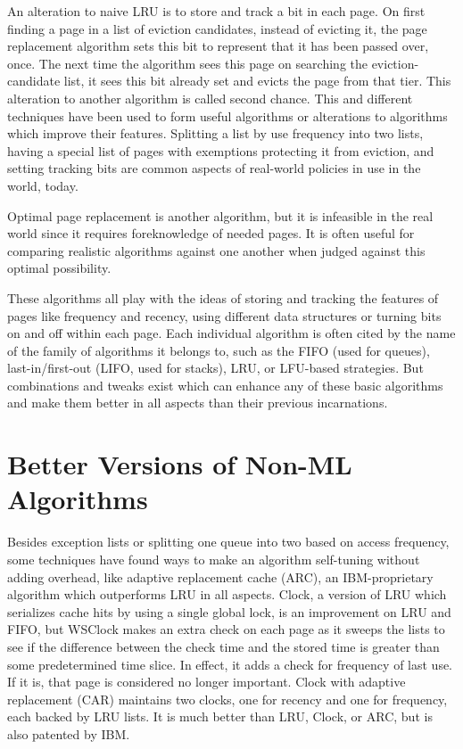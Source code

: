 \documentclass[conference]{IEEEtran}
\begin{document}
An alteration to naive LRU is to store and track a bit in each page.  On first finding a page in a list of eviction candidates, instead of evicting it, the page replacement algorithm sets this bit to represent that it has been passed over, once.  The next time the algorithm sees this page on searching the eviction-candidate list, it sees this bit already set and evicts the page from that tier.  This alteration to another algorithm is called second chance.  This and different techniques have been used to form useful algorithms or alterations to algorithms which improve their features.  Splitting a list by use frequency into two lists, having a special list of pages with exemptions protecting it from eviction, and setting tracking bits are common aspects of real-world policies in use in the world, today.   

Optimal page replacement is another algorithm, but it is infeasible in the real world since it requires foreknowledge of needed pages.  It is often useful for comparing realistic algorithms against one another when judged against this optimal possibility. 

These algorithms all play with the ideas of storing and tracking the features of pages like frequency and recency, using different data structures or turning bits on and off within each page.  Each individual algorithm is often cited by the name of the family of algorithms it belongs to, such as the FIFO (used for queues), last-in/first-out (LIFO, used for stacks), LRU, or LFU-based strategies.  But combinations and tweaks exist which can enhance any of these basic algorithms and make them better in all aspects than their previous incarnations. 

\section{Better Versions of Non-ML Algorithms}

Besides exception lists or splitting one queue into two based on access frequency, some techniques have found ways to make an algorithm self-tuning without adding overhead, like adaptive replacement cache (ARC), an IBM-proprietary algorithm which outperforms LRU in all aspects.  Clock, a version of LRU which serializes cache hits by using a single global lock, is an improvement on LRU and FIFO, but WSClock makes an extra check on each page as it sweeps the lists to see if the difference between the check time and the stored time is greater than some predetermined time slice.  In effect, it adds a check for frequency of last use.  If it is, that page is considered no longer important.  Clock with adaptive replacement (CAR) maintains two clocks, one for recency and one for frequency, each backed by LRU lists.  It is much better than LRU, Clock, or ARC, but is also patented by IBM.
\end{document}
